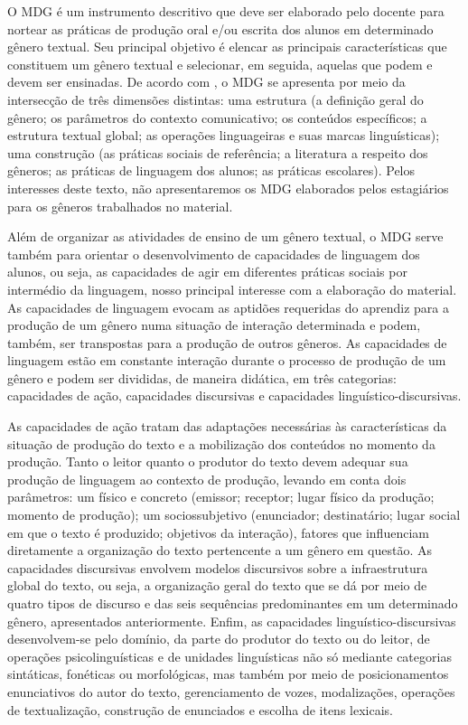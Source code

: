 O MDG é um instrumento descritivo que deve ser elaborado pelo docente
para nortear as práticas de produção oral e/ou escrita dos alunos em
determinado gênero textual. Seu principal objetivo é elencar as
principais características que constituem um gênero textual e
selecionar, em seguida, aquelas que podem e devem ser ensinadas. De
acordo com \textcite{de_pietro_modedidactique_2003}, o MDG se apresenta por meio da intersecção de três dimensões distintas: uma estrutura (a definição
geral do gênero; os parâmetros do contexto comunicativo; os conteúdos
específicos; a estrutura textual global; as operações linguageiras e
suas marcas linguísticas); uma construção (as práticas sociais de
referência; a literatura a respeito dos gêneros; as práticas de
linguagem dos alunos; as práticas escolares). Pelos interesses deste
texto, não apresentaremos os MDG elaborados pelos estagiários para os
gêneros trabalhados no material.

Além de organizar as atividades de ensino de um gênero textual, o MDG
serve também para orientar o desenvolvimento de capacidades de linguagem
dos alunos, ou seja, as capacidades de agir em diferentes práticas
sociais por intermédio da linguagem, nosso principal interesse com a
elaboração do material. As capacidades de linguagem \cite{dolz-mestre_acquisition_1993} evocam as aptidões requeridas do aprendiz para a
produção de um gênero numa situação de interação determinada e podem,
também, ser transpostas para a produção de outros gêneros. As
capacidades de linguagem estão em constante interação durante o processo
de produção de um gênero e podem ser divididas, de maneira didática, em
três categorias: capacidades de ação, capacidades discursivas e
capacidades linguístico-discursivas.

As capacidades de ação tratam das adaptações necessárias às
características da situação de produção do texto e a mobilização dos
conteúdos no momento da produção. Tanto o leitor quanto o produtor do
texto devem adequar sua produção de linguagem ao contexto de produção,
levando em conta dois parâmetros: um físico e concreto (emissor;
receptor; lugar físico da produção; momento de produção); um
sociossubjetivo (enunciador; destinatário; lugar social em que o texto é
produzido; objetivos da interação), fatores que influenciam diretamente
a organização do texto pertencente a um gênero em questão. As
capacidades discursivas envolvem modelos discursivos sobre a
infraestrutura global do texto, ou seja, a organização geral do texto
que se dá por meio de quatro tipos de discurso e das seis sequências
predominantes em um determinado gênero, apresentados anteriormente.
Enfim, as capacidades linguístico-discursivas desenvolvem-se pelo
domínio, da parte do produtor do texto ou do leitor, de operações
psicolinguísticas e de unidades linguísticas não só mediante categorias
sintáticas, fonéticas ou morfológicas, mas também por meio de
posicionamentos enunciativos do autor do texto, gerenciamento de vozes,
modalizações, operações de textualização, construção de enunciados e
escolha de itens lexicais.

